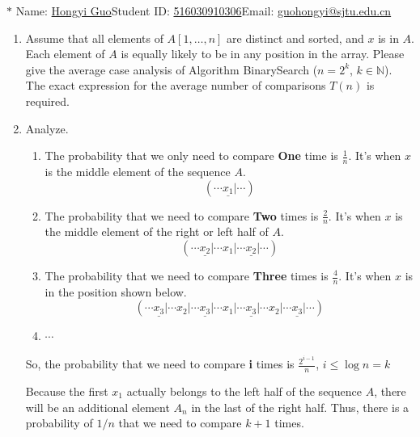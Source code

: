 \documentclass[12pt,a4paper]{article}
\makeatletter
\newtheorem*{solution}{Solution}
\theoremstyle{definition}
\renewenvironment{solution}[1][Solution] {\par\pushQED{\qed}\normalfont\topsep6\p@\@plus6\p@\relax\trivlist\item[\hskip\labelsep\bfseries#1\@addpunct{.}]\ignorespaces}{\popQED\endtrivlist\@endpefalse} \makeatother
\makeatother
\begin{document}
\noindent

\noindent{}
\begin{center}

\footnotesize{\color{blue}$*$ Name: \underline{Hongyi Guo}\quad Student ID: \underline{516030910306}\quad Email: \underline{guohongyi@sjtu.edu.cn}}
\end{center}

\begin{enumerate}
\item
Assume that all elements of $A[1,\dots,n]$ are distinct and sorted, and $x$ is in $A$. Each element of $A$ is equally likely to be in any position in the array. Please give the average case analysis of Algorithm BinarySearch ($n=2^k$, $k\in\mathbb{N}$). The exact expression for the average number of comparisons $T(n)$ is required.
\begin{solution} Analyze.

\begin{enumerate}
\item The probability that we only need to compare \textbf{One} time is $\frac{1}{n}$. It's when $x$ is the middle element of the sequence $A$.
    $$(\cdots \underline{x_1}|\cdots)$$
\item The probability that we need to compare \textbf{Two} times is $\frac{2}{n}$. It's when $x$ is the middle element of the right or left half of $A$.
    $$(\cdots \underline{x_2}|\cdots x_1|\cdots \underline{x_2}|\cdots)$$
\item The probability that we need to compare \textbf{Three} times is $\frac{4}{n}$. It's when $x$ is in the position shown below.
    $$(\cdots \underline{x_3}|\cdots x_2|\cdots \underline{x_3}|\cdots x_1|\cdots \underline{x_3}|\cdots x_2|\cdots \underline{x_3}|\cdots)$$
\item $\cdots$
\end{enumerate}
So, the probability that we need to compare \textbf{i} times is $\frac{2^{i-1}}{n}$, $i\leq\log n=k$

Because the first $x_1$ actually belongs to the left half of the sequence $A$, there will be an additional element $A_n$ in the last of the right half. Thus, there is a probability of $1/n$ that we need to compare $k+1$ times.


\end{solution}
\end{enumerate}
\end{document}
